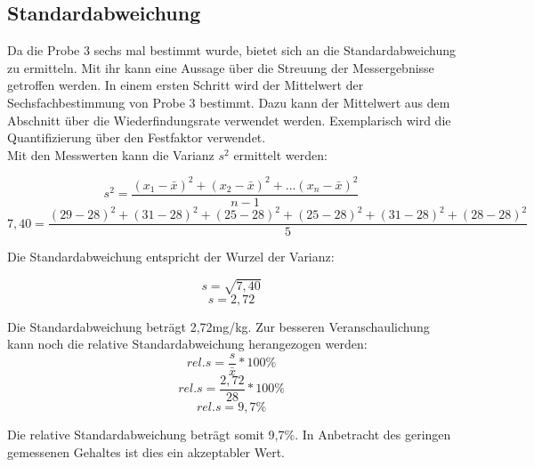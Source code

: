 \subsection{Standardabweichung}
Da die Probe 3 sechs mal bestimmt wurde, bietet sich an die Standardabweichung zu ermitteln. Mit ihr kann eine Aussage über die Streuung der Messergebnisse getroffen werden. In einem ersten Schritt wird der Mittelwert der Sechsfachbestimmung von Probe 3 bestimmt. Dazu kann der Mittelwert aus dem Abschnitt über die Wiederfindungsrate verwendet werden. Exemplarisch wird die Quantifizierung über den Festfaktor verwendet.\\
Mit den Messwerten kann die Varianz $s^{ 2 }$ ermittelt werden:

    \[s^{ 2 }=\frac{ (x_{ 1 }-\bar{x})^{ 2 }+(x_{ 2 }-\bar{x})^{ 2 }+...(x_{ n }-\bar{x})^{ 2 } }{ n-1 }\]
    \[7,40=\frac{ (29-28)^{ 2 }+(31-28)^{ 2 }+(25-28)^{ 2 }+(25-28)^{ 2 }+(31-28)^{ 2 }+(28-28)^{ 2 } }{ 5 }\]

Die Standardabweichung entspricht der Wurzel der Varianz:

    \[s=\sqrt{ 7,40 }\]
    \[s=2,72\]

Die Standardabweichung beträgt 2,72mg/kg. Zur besseren Veranschaulichung kann noch die relative Standardabweichung herangezogen werden:
    \[rel.s=\frac{ s }{ \bar{x} }*100\%\]
    \[rel.s=\frac{ 2,72 }{ 28 }*100\%\]
    \[rel.s=9,7\%\]

Die relative Standardabweichung beträgt somit 9,7\%. In Anbetracht des geringen gemessenen Gehaltes ist dies ein akzeptabler Wert.


